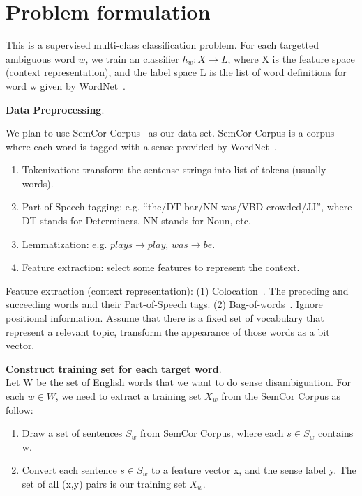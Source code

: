 \section{Problem formulation}

This is a supervised multi-class classification problem. For each targetted
ambiguous word $w$, we train an classifier $h_w: X \rightarrow L$, where X is
the feature space (context representation), and the label space L is the list of
word definitions for word w given by WordNet~\cite{wordnet}.

\textbf{Data Preprocessing}.

We plan to use SemCor Corpus~\cite{semcor} as our data set. SemCor Corpus is a
corpus where each word is tagged with a sense provided by WordNet~\cite{wordnet}.

\begin{enumerate}
  \item Tokenization: transform the sentense strings into list of tokens
    (usually words).
  \item Part-of-Speech tagging: e.g. ``the/DT bar/NN was/VBD crowded/JJ'', where
    DT stands for Determiners, NN stands for Noun, etc.
  \item Lemmatization: e.g. $plays \rightarrow play$, $was \rightarrow be$.
  \item Feature extraction: select some features to represent the context.
\end{enumerate}

Feature extraction (context representation): 
(1) Colocation~\cite{colocation}. The preceding and succeeding words and their
Part-of-Speech tags.  (2) Bag-of-words~\cite{bagofwords}. Ignore positional
information. Assume that there is a fixed set of vocabulary that represent a
relevant topic, transform the appearance of those words as a bit vector.

\textbf{Construct training set for each target word}.\\
Let W be the set of English words that we want to do sense disambiguation. For
each $w \in W$, we need to extract a training set $X_w$ from the SemCor Corpus
as follow: 
\begin{enumerate}
  \item Draw a set of sentences $S_w$ from SemCor Corpus, where each 
$s \in S_w$ contains w. 
  \item Convert each sentence $s \in S_w$ to a feature vector x, and the sense
    label y. The set of all (x,y) pairs is our training set $X_w$.
\end{enumerate}

